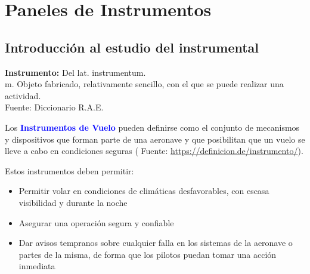 %




\chapter{Paneles de Instrumentos}
\label{chap:U01.paneles.instrumentos}


\section{Introducci\'on al estudio del instrumental}
\label{sec:01.01.introduccion.estudio.instrumental}

\begin{tcolorbox}{\bf Instrumento:} 
  Del lat. instrumentum.\\
  m. Objeto fabricado, relativamente sencillo, con el que se puede realizar una actividad.\\
  {\tiny Fuente: Diccionario R.A.E.}
\end{tcolorbox}

Los \textcolor{blue}{\bf Instrumentos de Vuelo} pueden definirse como
	el conjunto de mecanismos y dispositivos que forman parte de una aeronave y 
	que posibilitan que un vuelo se lleve a cabo en condiciones seguras 
( Fuente: \url{https://definicion.de/instrumento/}).

Estos instrumentos deben permitir: 

    \begin{itemize}
    \item Permitir volar en condiciones de clim\'aticas desfavorables, 
	con escasa visibilidad y durante la noche
    \item Asegurar una operaci\'on segura y confiable
    \item Dar avisos tempranos sobre cualquier falla en los sistemas
      de la aeronave o partes de la misma, de forma que los pilotos
      puedan tomar una acci\'on inmediata

    \end{itemize}
    


